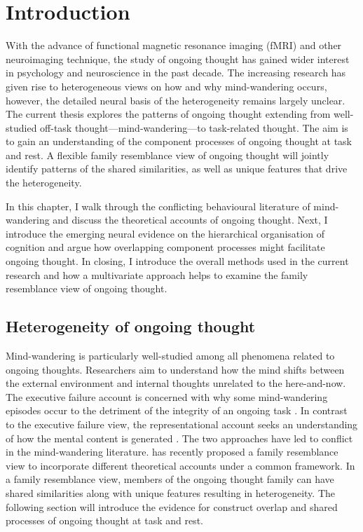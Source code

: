\chapter{Introduction}
\label{ch:intro}

With the advance of functional magnetic resonance imaging (fMRI) and other neuroimaging technique, the study of ongoing thought has gained wider interest in psychology and neuroscience in the past decade. The increasing research has given rise to heterogeneous views on how and why mind-wandering occurs, however, the detailed neural basis of the heterogeneity remains largely unclear. The current thesis explores the patterns of ongoing thought extending from well-studied off-task thought---mind-wandering---to task-related thought. The aim is to gain an understanding of the component processes of ongoing thought at task and rest. A flexible family resemblance view \cite{Seli2018} of ongoing thought will jointly identify patterns of the shared similarities, as well as unique features that drive the heterogeneity.

In this chapter, I walk through the conflicting behavioural literature of mind-wandering and discuss the theoretical accounts of ongoing thought. Next, I introduce the emerging neural evidence on the hierarchical organisation of cognition \cite{Margulies2016,Mesulam1998} and argue how overlapping component processes might facilitate ongoing thought. In closing, I introduce the overall methods used in the current research and how a multivariate approach helps to examine the family resemblance view of ongoing thought.

\section{Heterogeneity of ongoing thought}
\label{ch:intro:heterogeneity}


Mind-wandering is particularly well-studied among all phenomena related to ongoing thoughts. Researchers aim to understand how the mind shifts between the external environment and internal thoughts unrelated to the here-and-now. 
The executive failure account is concerned with why some mind-wandering episodes occur to the detriment of the integrity of an ongoing task \cite{McVay2010}. In contrast to the executive failure view, the representational account seeks an understanding of how the mental content is generated \cite{Smallwood2016}. The two approaches have led to conflict in the mind-wandering literature.  has recently proposed a family resemblance view to incorporate different theoretical accounts under a common framework. In a family resemblance view, members of the ongoing thought family can have shared similarities along with unique features resulting in heterogeneity. The following section will introduce the evidence for construct overlap and shared processes of ongoing thought at task and rest.

